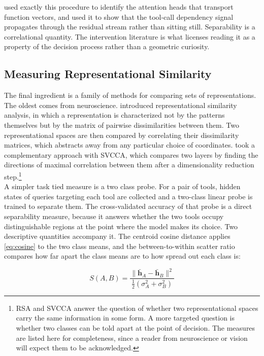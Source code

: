 \textcite{todd2024function} used exactly this procedure to identify the attention heads that transport function vectors, and \textcite{sun2026dependency} used it to show that the tool-call dependency signal propagates through the residual stream rather than sitting still.
Separability is a correlational quantity.
The intervention literature is what licenses reading it as a property of the decision process rather than a geometric curiosity.

\subsection{Measuring Representational Similarity}
\label{sec:repsim}

The final ingredient is a family of methods for comparing sets of representations.
The oldest comes from neuroscience.
\textcite{kriegeskorte2008rsa} introduced representational similarity analysis, in which a representation is characterized not by the patterns themselves but by the matrix of pairwise dissimilarities between them.
Two representational spaces are then compared by correlating their dissimilarity matrices, which abstracts away from any particular choice of coordinates.
\textcite{raghu2017svcca} took a complementary approach with SVCCA, which compares two layers by finding the directions of maximal correlation between them after a dimensionality reduction step.\footnote{RSA and SVCCA answer the question of whether two representational spaces carry the same information in some form. A more targeted question is whether two classes can be told apart at the point of decision. The measures are listed here for completeness, since a reader from neuroscience or vision will expect them to be acknowledged.}
\\

A simpler task tied measure is a two class probe.
For a pair of tools, hidden states of queries targeting each tool are collected and a two-class linear probe is trained to separate them.
The cross-validated accuracy of that probe is a direct separability measure, because it answers whether the two tools occupy distinguishable regions at the point where the model makes its choice.
Two descriptive quantities accompany it.
The centroid cosine distance applies \cref{eq:cosine} to the two class means, and the between-to-within scatter ratio compares how far apart the class means are to how spread out each class is:

\begin{equation}
S(A, B) = \frac{\lVert \bar{\mathbf{h}}_A - \bar{\mathbf{h}}_B \rVert^2}{\frac{1}{2}\left( \sigma_A^2 + \sigma_B^2 \right)}
\label{eq:scatter}
\end{equation}

